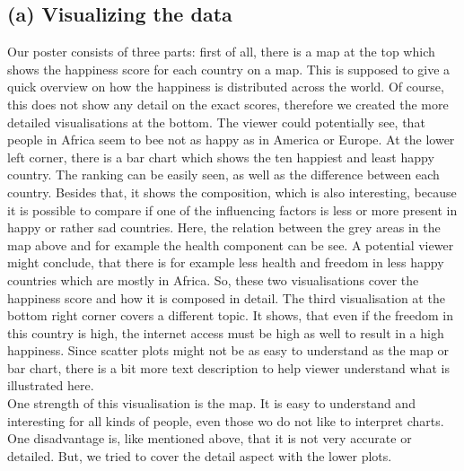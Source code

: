 \documentclass[a4paper]{article}
\begin{document}
\subsection*{(a) Visualizing the data}
Our poster consists of three parts: first of all, there is a map at the top which shows the happiness score for each country on a map. 
This is supposed to give a quick overview on how the happiness is distributed across the world. 
Of course, this does not show any detail on the exact scores, therefore we created the more detailed visualisations at the bottom. 
The viewer could potentially see, that people in Africa seem to bee not as happy as in America or Europe.  
At the lower left corner, there is a bar chart which shows the ten happiest and least happy country. 
The ranking can be easily seen, as well as the difference between each country. 
Besides that, it shows the composition, which is also interesting, because it is possible to compare if one of the influencing factors is less or more present in happy or rather sad countries. 
Here, the relation between the grey areas in the map above and for example the health component can be see. 
A potential viewer might conclude, that there is for example less health and freedom in less happy countries which are mostly in Africa. 
So, these two visualisations cover the happiness score and how it is composed in detail. 
The third visualisation at the bottom right corner covers a different topic. 
It shows, that even if the freedom in this country is high, the internet access must be high as well to result in a high happiness. 
Since scatter plots might not be as easy to understand as the map or bar chart, there is a bit more text description to help viewer understand what is illustrated here. \\ \linebreak
One strength of this visualisation is the map. 
It is easy to understand and interesting for all kinds of people, even those wo do not like to interpret charts. 
One disadvantage is, like mentioned above, that it is not very accurate or detailed. 
But, we tried to cover the detail aspect with the lower plots. 
\end{document}
